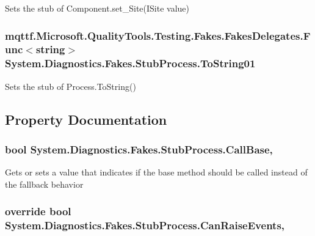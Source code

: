 Sets the stub of Component.\-set\-\_\-\-Site(\-I\-Site value)

\hypertarget{class_system_1_1_diagnostics_1_1_fakes_1_1_stub_process_a2e246d8b5bd2003096a05778cf4b5056}{
\subsubsection[{To\-String01}]{\setlength{\rightskip}{0pt plus 5cm}mqttf.\-Microsoft.\-Quality\-Tools.\-Testing.\-Fakes.\-Fakes\-Delegates.\-Func$<$string$>$ System.\-Diagnostics.\-Fakes.\-Stub\-Process.\-To\-String01}}\label{class_system_1_1_diagnostics_1_1_fakes_1_1_stub_process_a2e246d8b5bd2003096a05778cf4b5056}


Sets the stub of Process.\-To\-String()



\subsection{Property Documentation}
\hypertarget{class_system_1_1_diagnostics_1_1_fakes_1_1_stub_process_aef1d6c644e3ddee3287af6162a2df9f8}{
\subsubsection[{Call\-Base}]{\setlength{\rightskip}{0pt plus 5cm}bool System.\-Diagnostics.\-Fakes.\-Stub\-Process.\-Call\-Base\hspace{0.3cm}{\ttfamily [get]}, {\ttfamily [set]}}}\label{class_system_1_1_diagnostics_1_1_fakes_1_1_stub_process_aef1d6c644e3ddee3287af6162a2df9f8}


Gets or sets a value that indicates if the base method should be called instead of the fallback behavior

\hypertarget{class_system_1_1_diagnostics_1_1_fakes_1_1_stub_process_ac2357f0230f31931fc32f69f7f2e8202}{
\subsubsection[{Can\-Raise\-Events}]{\setlength{\rightskip}{0pt plus 5cm}override bool System.\-Diagnostics.\-Fakes.\-Stub\-Process.\-Can\-Raise\-Events\hspace{0.3cm}{\ttfamily [get]}, {\ttfamily [protected]}}}\label{class_system_1_1_diagnostics_1_1_fakes_1_1_stub_process_ac2357f0230f31931fc32f69f7f2e8202}


